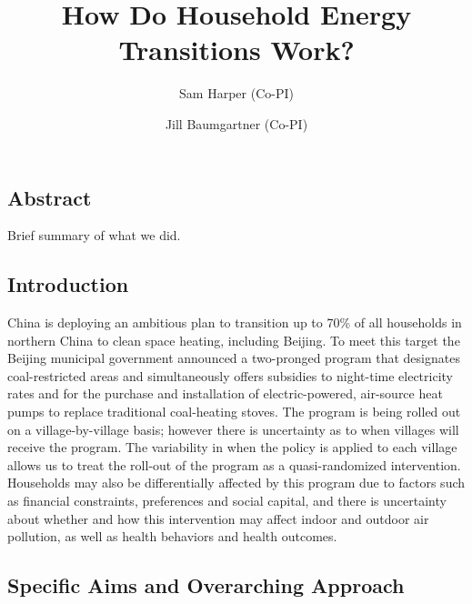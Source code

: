 \documentclass[
  letterpaper,
  DIV=11,
  numbers=noendperiod]{scrartcl}
\title{How Do Household Energy Transitions Work?}
\author{Sam Harper (Co-PI) \and Jill Baumgartner (Co-PI)}
\date{}
\renewcommand*\contentsname{Table of contents}
\newcommand\contentsname{Table of contents}
\begin{document}
\maketitle
\ifdefined\Shaded\renewenvironment{Shaded}{\begin{tcolorbox}[interior hidden, boxrule=0pt, enhanced, breakable, borderline west={3pt}{0pt}{shadecolor}, sharp corners, frame hidden]}{\end{tcolorbox}}\fi

\renewcommand*\contentsname{Table of contents}
{
\hypersetup{linkcolor=}
\setcounter{tocdepth}{3}
\tableofcontents
}
\hypertarget{abstract}{%
\subsection{Abstract}\label{abstract}}

Brief summary of what we did.

\hypertarget{introduction}{%
\subsection{Introduction}\label{introduction}}

China is deploying an ambitious plan to transition up to 70\% of all
households in northern China to clean space heating, including Beijing.
To meet this target the Beijing municipal government announced a
two-pronged program that designates coal-restricted areas and
simultaneously offers subsidies to night-time electricity rates and for
the purchase and installation of electric-powered, air-source heat pumps
to replace traditional coal-heating stoves. The program is being rolled
out on a village-by-village basis; however there is uncertainty as to
when villages will receive the program. The variability in when the
policy is applied to each village allows us to treat the roll-out of the
program as a quasi-randomized intervention. Households may also be
differentially affected by this program due to factors such as financial
constraints, preferences and social capital, and there is uncertainty
about whether and how this intervention may affect indoor and outdoor
air pollution, as well as health behaviors and health outcomes.

\hypertarget{specific-aims-and-overarching-approach}{%
\subsection{Specific Aims and Overarching
Approach}\label{specific-aims-and-overarching-approach}}
\end{document}
